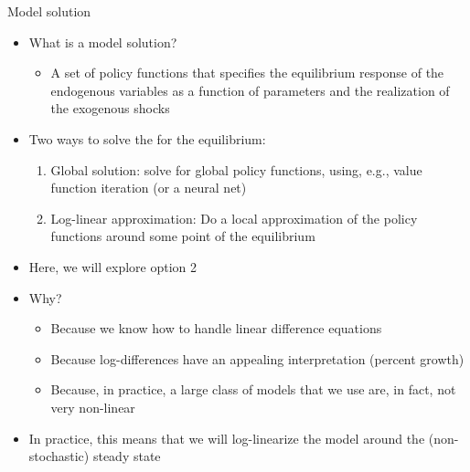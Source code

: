 \documentclass[9pt,xcolor={dvipsnames}]{beamer}
\newcommand{\bit}{\begin{itemize}}
\newcommand{\eit}{\end{itemize}}
\newcommand{\ben}{\begin{enumerate}}
\newcommand{\een}{\end{enumerate}}
\newcommand{\bc}{\color{blue}}
\begin{document}
\begin{frame}{Model solution}

\bit
\setlength\itemsep{1.5em}

\item What is a model solution?
\bit
\setlength\itemsep{0.5em}
\item A set of policy functions that specifies the equilibrium response of the endogenous variables as a function of {\bc parameters} and the realization of the {\bc exogenous shocks}
\eit


\item Two ways to solve the for the equilibrium:
\ben
\setlength\itemsep{0.5em}
\item Global solution: solve for global policy functions, using, e.g., value function iteration (or a neural net)

\item Log-linear approximation: Do a local approximation of the policy functions around some point of the equilibrium
\een

\item Here, we will explore option 2

\item Why?
\bit
\setlength\itemsep{0.5em}

\item Because we know how to handle linear difference equations

\item Because log-differences have an appealing interpretation (percent growth)

\item Because, in practice, a large class of models that we use are, in fact, not very non-linear 
\eit

\item In practice, this means that we will {\bc log-linearize} the model around the (non-stochastic) {\bc steady state}

\eit

\end{frame}
\end{document}
